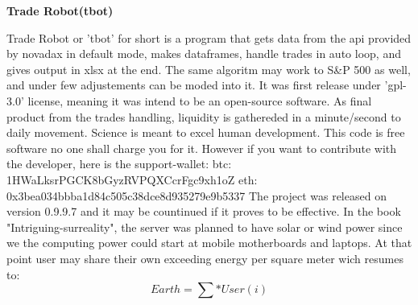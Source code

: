 \documentclass[a4paper,12pt]{article}
\begin{document}
\pagestyle{empty}
\begin{center}
  \huge
  \vspace*{-5cm}
  \textbf{Trade Robot(tbot)}
  \vspace*{.015\baselineskip}
  \end{center}
\begin{center}
\begin{flushleft}
   Trade Robot or 'tbot' for short is a program that gets data from the api
  provided by novadax in default mode, makes dataframes, handle trades in
  auto loop, and gives output in xlsx at the end.
  \linebreak
  \vspace*{0.05\baselineskip}
   The same algoritm may work to S\&P 500 as well, and under few adjustements
  can be moded into it. It was first release under 'gpl-3.0' license, meaning
  it was intend to be an open-source software.
  \linebreak
  \vspace*{0.05\baselineskip}
  As final product from the trades handling, liquidity is gathereded in a
  minute/second to daily movement. Science is meant to excel human development.
  \linebreak
  \vspace*{0.05\baselineskip}
  This code is free software no one shall charge you for it. However if you
  want to contribute with the developer, here is the support-wallet:
  \linebreak
  \vspace*{0.05\baselineskip}
  btc: 1HWaLksrPGCK8bGyzRVPQXCcrFgc9xh1oZ
  \linebreak
  \vspace*{0.05\baselineskip}
  eth: 0x3bea034bbba1d84c505c38dce8d935279e9b5337
  \linebreak
  \vspace*{0.05\baselineskip}
   The project was released on version 0.9.9.7 and it may be countinued if
  it proves to be effective. In the book "Intriguing-surreality", the server
  was planned to have solar or wind power since we the computing power could
  start at mobile motherboards and laptops. At that point user may share
  their own exceeding energy per square meter wich resumes to:
  \vspace*{0.05\baselineskip}
  \begin{equation}
    Earth = \sum * User(i)
    \end{equation}
  \vspace*{0.05\baselineskip}

\end{flushleft}
\end{center}
\end{document}
